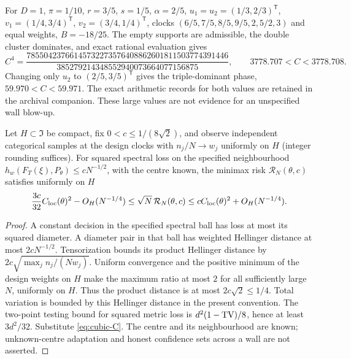 \begin{example}
For $D=1$, $\pi=1/10$, $r=3/5$, $s=1/5$, $\alpha=2/5$,
$u_1=u_2=(1/3,2/3)^{\mathsf T}$,
$v_1=(1/4,3/4)^{\mathsf T}$, $v_2=(3/4,1/4)^{\mathsf T}$,
clocks $(6/5,7/5,8/5,9/5,2,5/2,3)$ and equal weights,
$B=-18/25$. The empty supports are admissible, the double cluster
dominates, and exact rational evaluation gives
\[
 C^4=\frac{78550423766145732273576408862601811503774391446}
            {385279214348552940073664077156875},\qquad
 3778.707<C<3778.708.
\]
Changing only $u_2$ to $(2/5,3/5)^{\mathsf T}$ gives the triple-dominant
phase, $59.970<C<59.971$. The exact arithmetic records for both values
are retained in the archival companion. These large values are not
evidence for an unspecified wall blow-up.
\end{example}

\begin{corollary}\label{cor:risk}
Let $H\subset\mathfrak I$ be compact, fix $0<c\le1/(8\sqrt2)$, and
observe independent categorical samples at the design clocks with
$n_j/N\to w_j$ uniformly on $H$ (integer rounding suffices).
For squared spectral loss on the specified neighbourhood
$h_w(F_T(\xi),P_\theta)\le cN^{-1/2}$, with the centre known, the
minimax risk $\mathcal R_N(\theta,c)$ satisfies uniformly on $H$
\[
 \frac{3c}{32}C_{\mathrm{loc}}(\theta)^2-O_H(N^{-1/4})
 \le\sqrt N\,\mathcal R_N(\theta,c)
 \le cC_{\mathrm{loc}}(\theta)^2+O_H(N^{-1/4}).
\]
\end{corollary}
\begin{proof}
A constant decision in the specified spectral ball has loss at most
its squared diameter. A diameter pair in that ball has weighted
Hellinger distance at most $2cN^{-1/2}$. Tensorization bounds its product
Hellinger distance by $2c\sqrt{\max_j n_j/(Nw_j)}$. Uniform convergence
and the positive minimum of the design weights on $H$ make the maximum
ratio at most $2$ for all sufficiently large $N$, uniformly on $H$.
Thus the product distance is at most $2c\sqrt2\le1/4$. Total variation
is bounded by this Hellinger distance in the present convention. The
two-point testing bound for squared metric loss is $d^2(1-\operatorname{TV})/8$,
hence at least $3d^2/32$. Substitute \eqref{eq:cubic-C}. The centre and
its neighbourhood are known; unknown-centre adaptation and honest
confidence sets across a wall are not asserted.
\end{proof}
